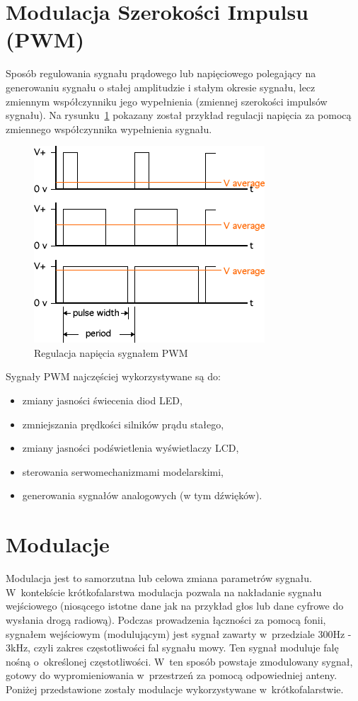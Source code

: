 \documentclass[eng,oneside]{mgr}
\begin{document}
		\section{Modulacja Szerokości Impulsu (PWM)}
		Sposób regulowania sygnału prądowego lub napięciowego polegający na generowaniu sygnału o stałej amplitudzie i stałym okresie sygnału, lecz zmiennym współczynniku jego wypełnienia (zmiennej szerokości impulsów sygnału). Na rysunku~\ref{fig:pwm} pokazany został przykład regulacji napięcia za pomocą zmiennego współczynnika wypełnienia sygnału. 

		\begin{figure}[!htb]
			\begin{center}
				\includegraphics[scale=0.8]{pwm}
			\end{center}
			\caption{Regulacja napięcia sygnałem PWM}
			\label{fig:pwm}
		\end{figure}
		
		Sygnały PWM najczęściej wykorzystywane są do:
		\begin{itemize}
		 	\item zmiany jasności świecenia diod LED,
		 	\item zmniejszania prędkości silników prądu stałego,
		 	\item zmiany jasności podświetlenia wyświetlaczy LCD,
		 	\item sterowania serwomechanizmami modelarskimi,
		 	\item generowania sygnałów analogowych (w tym dźwięków).
		 \end{itemize} 

		\section{Modulacje}
		Modulacja jest to samorzutna lub celowa zmiana parametrów sygnału. W~kontekście krótkofalarstwa modulacja pozwala na nakładanie sygnału wejściowego (niosącego istotne dane jak na przykład głos lub dane cyfrowe do wysłania drogą radiową). Podczas prowadzenia łączności za pomocą fonii, sygnałem wejściowym (modulującym) jest sygnał zawarty w~przedziale 300Hz - 3kHz, czyli zakres częstotliwości fal sygnału mowy. Ten sygnał moduluje falę nośną o~określonej częstotliwości. W~ten sposób powstaje zmodulowany sygnał, gotowy do wypromieniowania w~przestrzeń za pomocą odpowiedniej anteny.
		Poniżej przedstawione zostały modulacje wykorzystywane w~krótkofalarstwie.
			
\end{document}
